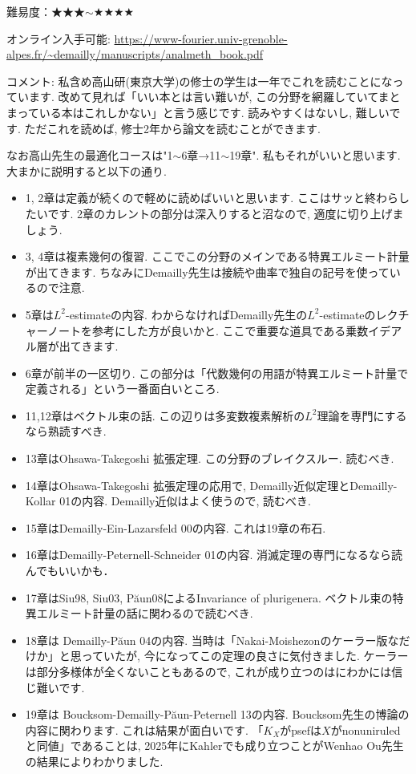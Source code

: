 難易度：★★★$\sim$★★★★ \vspace{-6pt} 

オンライン入手可能: \url{https://www-fourier.univ-grenoble-alpes.fr/~demailly/manuscripts/analmeth_book.pdf}\vspace{-6pt}

コメント: 私含め高山研(東京大学)の修士の学生は一年でこれを読むことになっています. 改めて見れば「いい本とは言い難いが, この分野を網羅していてまとまっている本はこれしかない」と言う感じです. 読みやすくはないし, 難しいです. ただこれを読めば, 修士2年から論文を読むことができます. 

なお高山先生の最適化コースは"1$\sim$6章→11$\sim$19章". 私もそれがいいと思います. 大まかに説明すると以下の通り.
\vspace{-8pt}
\begin{itemize}[left=0pt]
  \setlength{\parskip}{0cm} %
  \setlength{\itemsep}{0cm} %
\item 1, 2章は定義が続くので軽めに読めばいいと思います.  ここはサッと終わらしたいです. 2章のカレントの部分は深入りすると沼なので, 適度に切り上げましょう. 
\item 3, 4章は複素幾何の復習. ここでこの分野のメインである特異エルミート計量が出てきます. ちなみにDemailly先生は接続や曲率で独自の記号を使っているので注意. 
\item 5章は$L^2$-estimateの内容. わからなければDemailly先生の$L^2$-estimateのレクチャーノートを参考にした方が良いかと. ここで重要な道具である乗数イデアル層が出てきます. 
\item 6章が前半の一区切り. この部分は「代数幾何の用語が特異エルミート計量で定義される」という一番面白いところ. 
\item 11,12章はベクトル束の話. この辺りは多変数複素解析の$L^2$理論を専門にするなら熟読すべき.
\item 13章はOhsawa-Takegoshi 拡張定理. この分野のブレイクスルー. 読むべき.
\item 14章はOhsawa-Takegoshi 拡張定理の応用で, Demailly近似定理とDemailly-Kollar 01の内容. Demailly近似はよく使うので, 読むべき. 
\item 15章はDemailly-Ein-Lazarsfeld 00の内容. これは19章の布石. 
\item 16章はDemailly-Peternell-Schneider 01の内容. 消滅定理の専門になるなら読んでもいいかも．
\item 17章はSiu98, Siu03, P\u{a}un08によるInvariance of plurigenera. ベクトル束の特異エルミート計量の話に関わるので読むべき.
\item 18章は Demailly-P\u{a}un 04の内容. 当時は「Nakai-Moishezonのケーラー版なだけか」と思っていたが, 今になってこの定理の良さに気付きました. ケーラーは部分多様体が全くないこともあるので, これが成り立つのはにわかには信じ難いです. 
\item 19章は Boucksom-Demailly-P\u{a}un-Peternell 13の内容. Boucksom先生の博論の内容に関わります. これは結果が面白いです. 「$K_X$がpsefは$X$がnonuniruledと同値」であることは, 2025年にKahlerでも成り立つことがWenhao Ou先生の結果によりわかりました. 
\end{itemize}
